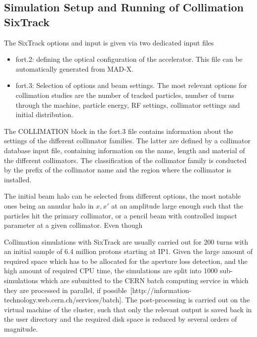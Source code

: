 \subsection{Simulation Setup and Running of Collimation SixTrack}
The SixTrack options and input is given via two dedicated input files
\begin{itemize}
  \item fort.2: defining the optical configuration of the accelerator. This file can be automatically generated from MAD-X.
  \item fort.3: Selection of options and beam settings. The most relevant options for collimation studies are the number of tracked particles, number of turns through the machine, particle energy, RF settings, collimator settings and initial distribution. 
\end{itemize}
The COLLIMATION block in the fort.3 file contains information about the settings of the different collimator families. The latter are defined by a collimator database input file, containing information on the name, length and material of the different collimators. The classification of the collimator family is conducted by the prefix of the collimator name and the region where the collimator is installed. 

The initial beam halo can be selected from different options, the most notable ones being an annular halo in $x,x'$ at an amplitude large enough such that the particles hit the primary collimator, or a pencil beam with controlled impact parameter at a given collimator. Even though 

Collimation simulations with SixTrack are usually carried out for 200 turns with an initial sample of 6.4 million protons  starting at IP1. Given the large amount of required space which has to be allocated for the aperture loss detection, and the high amount of required CPU time, the simulations are split into 1000 sub-simulations which are submitted to the CERN batch computing service in which they are processed in parallel, if possible~\cite{}[http://information-technology.web.cern.ch/services/batch]. The post-processing is carried out on the virtual machine of the cluster, such that only the relevant output is saved back in the user directory and the required disk space is reduced by several orders of magnitude. 



